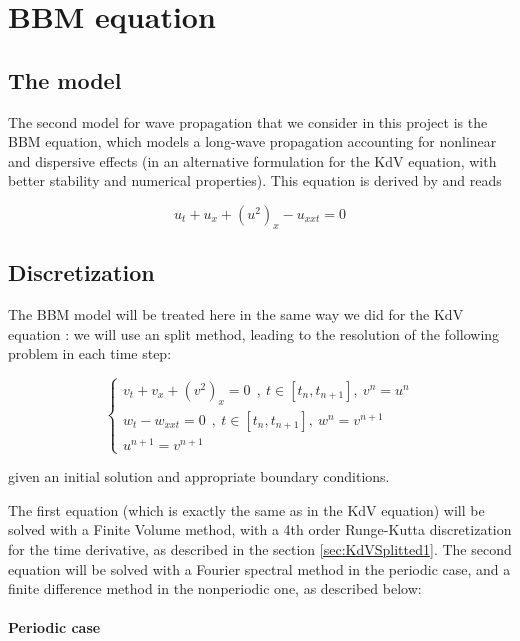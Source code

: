 \section{BBM equation}
\label{sec:BBM}

\subsection{The model}

\indent The second model for wave propagation that we consider in this project is the BBM equation, which models a long-wave propagation accounting for nonlinear and dispersive effects (in an alternative formulation for the KdV equation, with better stability and numerical properties). This equation is derived by \cite{BBM1971} and reads

\begin{equation}
    u_t + u_x + (u^2)_x - u_{xxt} = 0 
\end{equation}

\subsection{Discretization}

\indent The BBM model will be treated here in the same way we did for the KdV equation : we will use an split method, leading to the resolution of the following problem in each time step: 

\begin{equation}
\begin{cases}
    v_t + v_x + (v^2)_x = 0 \ \ ,\ t \in [t_n,t_{n+1}], \  v^n= u^n \\
    w_t - w_{xxt} = 0 \ \ , \ t \in [t_n,t_{n+1}], \  w^n = v^{n+1} \\
    u^{n+1} = v^{n+1}
\end{cases}
\end{equation}

\noindent given an initial solution and appropriate boundary conditions.

\indent The first equation (which is exactly the same as in the KdV equation) will be solved with a Finite Volume method, with a 4th order Runge-Kutta discretization for the time derivative, as described in the section \ref{sec:KdVSplitted1}.  The second equation will be solved with a Fourier spectral method in the periodic case, and a finite difference method in the nonperiodic one, as described below:

\paragraph{Periodic case}

